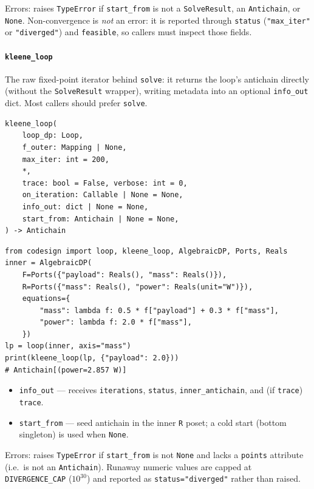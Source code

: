 \documentclass[11pt,a4paper]{article}
\begin{document}
Errors: raises \texttt{TypeError} if \texttt{start\_from} is not a
\texttt{SolveResult}, an \texttt{Antichain}, or \texttt{None}.
Non-convergence is \emph{not} an error: it is reported through
\texttt{status} (\texttt{"max\_iter"} or \texttt{"diverged"}) and
\texttt{feasible}, so callers must inspect those fields.

\paragraph{\texttt{kleene\_loop}}
\label{ref:solver:kleene_loop}
The raw fixed-point iterator behind \texttt{solve}: it returns the loop's
antichain directly (without the \texttt{SolveResult} wrapper), writing
metadata into an optional \texttt{info\_out} dict. Most callers should
prefer \texttt{solve}.
\begin{lstlisting}
kleene_loop(
    loop_dp: Loop,
    f_outer: Mapping | None,
    max_iter: int = 200,
    *,
    trace: bool = False, verbose: int = 0,
    on_iteration: Callable | None = None,
    info_out: dict | None = None,
    start_from: Antichain | None = None,
) -> Antichain
\end{lstlisting}
\begin{lstlisting}
from codesign import loop, kleene_loop, AlgebraicDP, Ports, Reals
inner = AlgebraicDP(
    F=Ports({"payload": Reals(), "mass": Reals()}),
    R=Ports({"mass": Reals(), "power": Reals(unit="W")}),
    equations={
        "mass": lambda f: 0.5 * f["payload"] + 0.3 * f["mass"],
        "power": lambda f: 2.0 * f["mass"],
    })
lp = loop(inner, axis="mass")
print(kleene_loop(lp, {"payload": 2.0}))
# Antichain[(power=2.857 W)]
\end{lstlisting}
\begin{itemize}[nosep]
  \item \texttt{info\_out} --- receives \texttt{iterations},
        \texttt{status}, \texttt{inner\_antichain}, and (if
        \texttt{trace}) \texttt{trace}.
  \item \texttt{start\_from} --- seed antichain in the inner \texttt{R}
        poset; a cold start (bottom singleton) is used when \texttt{None}.
\end{itemize}
Errors: raises \texttt{TypeError} if \texttt{start\_from} is not
\texttt{None} and lacks a \texttt{points} attribute (i.e.\ is not an
\texttt{Antichain}). Runaway numeric values are capped at
\texttt{DIVERGENCE\_CAP} ($10^{30}$) and reported as
\texttt{status="diverged"} rather than raised.
\end{document}
